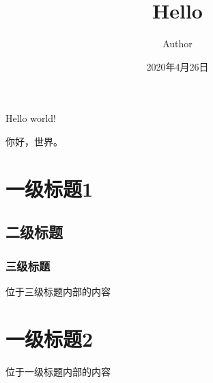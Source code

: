\documentclass{article}
\title{Hello}
\author{Author}
\date{2020年4月26日}
\begin{document}
    \maketitle
    Hello world!
    
    你好，世界。
    \section{一级标题1}
        \subsection{二级标题}
            \subsubsection{三级标题}
                位于三级标题内部的内容
    \section{一级标题2}
        位于一级标题内部的内容
\end{document}
